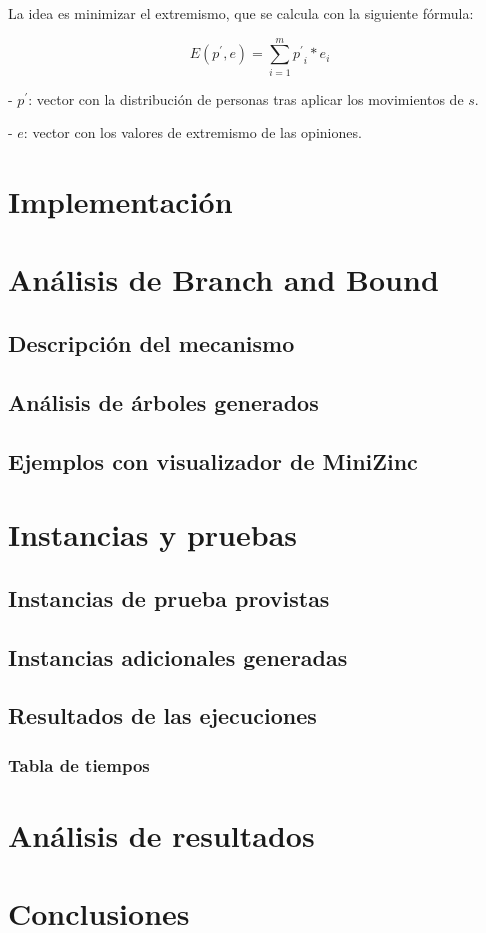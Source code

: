 La idea es minimizar el extremismo, que se calcula con la siguiente fórmula:

\begin{equation}
	E(p^\prime,e) = \sum_{ i = 1 }^m { p^\prime }_i * e_i
\end{equation}

- $p^\prime$: vector con la distribución de personas tras aplicar los movimientos de $s$.

- $e$: vector con los valores de extremismo de las opiniones.

\section{Implementación}

\section{Análisis de Branch and Bound}

\subsection{Descripción del mecanismo}

\subsection{Análisis de árboles generados}

\subsection{Ejemplos con visualizador de MiniZinc}

\section{Instancias y pruebas}

\subsection{Instancias de prueba provistas}

\subsection{Instancias adicionales generadas}

\subsection{Resultados de las ejecuciones}

\subsubsection{Tabla de tiempos}

\section{Análisis de resultados}

\section{Conclusiones}


